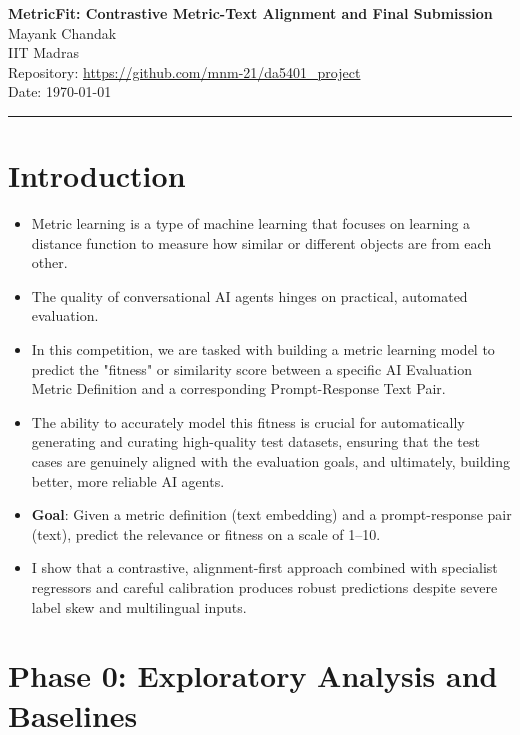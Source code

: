 \documentclass[11pt]{article}
\newcommand{\ProjectTitle}{MetricFit: Contrastive Metric-Text Alignment and Final Submission}
\newcommand{\AuthorName}{Mayank Chandak}
\newcommand{\Affiliation}{IIT Madras}
\newcommand{\RepoURL}{\url{https://github.com/mnm-21/da5401_project}}
\newcommand{\DateSubmitted}{\today}
\begin{document}
\begin{center}
  {\LARGE \bf \ProjectTitle \\[8pt]}
  {\large \AuthorName \\ \Affiliation \\[4pt]}
  {\small Repository: \RepoURL \\ Date: \DateSubmitted}
\end{center}

\vspace{8pt}
\hrule
\vspace{12pt}

\tableofcontents
\clearpage

\section{Introduction}
\label{sec:intro}

\begin{itemize}
    \item Metric learning is a type of machine learning that focuses on learning a distance function to measure how similar or different objects are from each other.
    \item The quality of conversational AI agents hinges on practical, automated evaluation.
    \item In this competition, we are tasked with building a metric learning model to predict the "fitness" or similarity score between a specific AI Evaluation Metric Definition and a corresponding Prompt-Response Text Pair.
    \item The ability to accurately model this fitness is crucial for automatically generating and curating high-quality test datasets, ensuring that the test cases are genuinely aligned with the evaluation goals, and ultimately, building better, more reliable AI agents.
    \item \textbf{Goal}: Given a metric definition (text embedding) and a prompt-response pair (text), predict the relevance or fitness on a scale of 1--10.
    \item I show that a contrastive, alignment-first approach combined with specialist regressors and careful calibration produces robust predictions despite severe label skew and multilingual inputs.
\end{itemize}
\newpage
\section{Phase 0: Exploratory Analysis and Baselines}
\label{sec:phase0}
\end{document}
